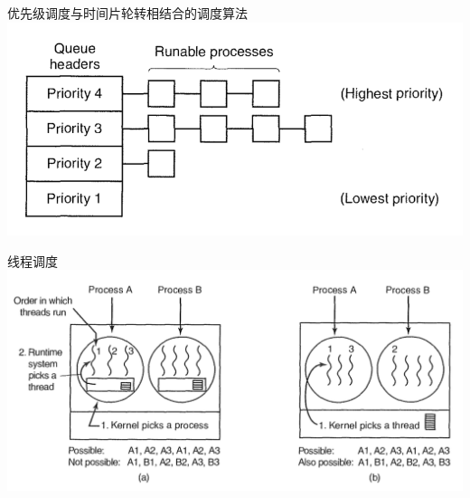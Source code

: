 \documentclass[xcolor=svgnames]{beamer}
\begin{document}
\begin{CJK*}{UTF8}{gbsn}
\begin{frame}{优先级调度与时间片轮转相结合的调度算法}
\includegraphics[width=1.0\textwidth]{comb.png}
\end{frame}

\begin{frame}{线程调度}
\includegraphics[width=1.0\textwidth]{thread.png}
\end{frame}
\end{CJK*}
\end{document}
